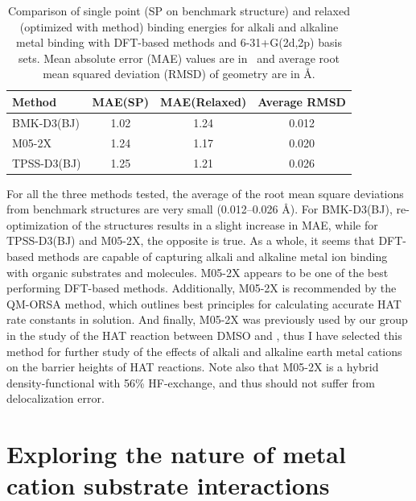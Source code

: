 \begin{table}
  \caption[Comparison of single point and relaxed binding energies for alkali and alkaline metal binding with DFT-based methods.]{Comparison of single point (SP on benchmark structure) and relaxed (optimized with method) binding energies for alkali and alkaline metal binding with DFT-based methods and 6-31+G(2d,2p) basis sets. Mean absolute error (MAE) values are in \kcalmol\ and average root mean squared deviation (RMSD) of geometry are in \AA.}\label{tab:ccsd-metal-opt}
  \begin{tabular}{l c c c}
    Method & MAE(SP) & MAE(Relaxed) & Average RMSD \\
    \hline
    BMK-D3(BJ) & 1.02 & 1.24 & 0.012 \\
    M05-2X & 1.24 & 1.17 & 0.020 \\
    TPSS-D3(BJ) & 1.25 & 1.21 & 0.026 \\
  \end{tabular}
\end{table}

For all the three methods tested, the average of the root mean square deviations from benchmark structures are very small (0.012--0.026 \AA). For BMK-D3(BJ), re-optimization of the structures results in a slight increase in MAE, while for TPSS-D3(BJ) and M05-2X, the opposite is true. As a whole, it seems that DFT-based methods are capable of capturing alkali and alkaline metal ion binding with organic substrates and molecules. M05-2X appears to be one of the best performing DFT-based methods. Additionally, M05-2X is recommended by the QM-ORSA\cite{Galano2013} method, which outlines best principles for calculating accurate HAT rate constants in solution. And finally, M05-2X was previously used by our group in the study of the HAT reaction between DMSO and \bno,\cite{vanSanten2016} thus I have selected this method for further study of the effects of alkali and alkaline earth metal cations on the barrier heights of HAT reactions. Note also that M05-2X is a hybrid density-functional with 56\% HF-exchange, and thus should not suffer from delocalization error.

\section{Exploring the nature of metal cation substrate interactions}



